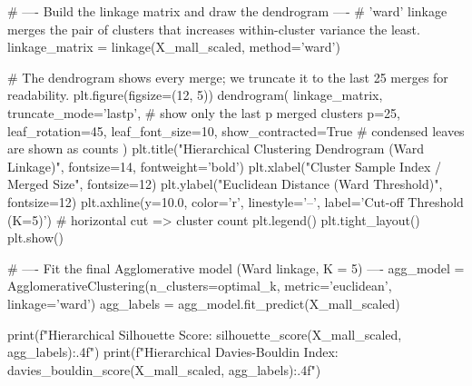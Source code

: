 \begin{codebox}[title={Build the linkage matrix and draw the dendrogram}]
# ---- Build the linkage matrix and draw the dendrogram ----
# 'ward' linkage merges the pair of clusters that increases within-cluster variance the least.
linkage_matrix = linkage(X_mall_scaled, method='ward')

# The dendrogram shows every merge; we truncate it to the last 25 merges for readability.
plt.figure(figsize=(12, 5))
dendrogram(
    linkage_matrix,
    truncate_mode='lastp',   # show only the last p merged clusters
    p=25,
    leaf_rotation=45,
    leaf_font_size=10,
    show_contracted=True     # condensed leaves are shown as counts
)
plt.title("Hierarchical Clustering Dendrogram (Ward Linkage)", fontsize=14, fontweight='bold')
plt.xlabel("Cluster Sample Index / Merged Size", fontsize=12)
plt.ylabel("Euclidean Distance (Ward Threshold)", fontsize=12)
plt.axhline(y=10.0, color='r', linestyle='--', label='Cut-off Threshold (K=5)')  # horizontal cut => cluster count
plt.legend()
plt.tight_layout()
plt.show()
\end{codebox}

\begin{codebox}[title={Fit the final Agglomerative model (Ward linkage, K = 5)}]
# ---- Fit the final Agglomerative model (Ward linkage, K = 5) ----
agg_model = AgglomerativeClustering(n_clusters=optimal_k, metric='euclidean', linkage='ward')
agg_labels = agg_model.fit_predict(X_mall_scaled)

print(f"Hierarchical Silhouette Score: {silhouette_score(X_mall_scaled, agg_labels):.4f}")
print(f"Hierarchical Davies-Bouldin Index: {davies_bouldin_score(X_mall_scaled, agg_labels):.4f}")
\end{codebox}
